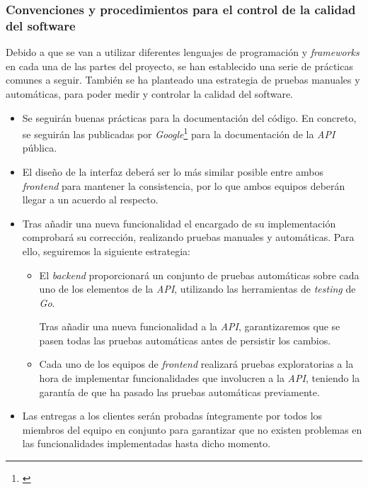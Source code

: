 \documentclass[11pt, a4paper, titlepage]{article}
\begin{document}
\subsubsection{Convenciones y procedimientos para el control de la calidad del software}

Debido a que se van a utilizar diferentes lenguajes de programación y \textit{frameworks} en cada una de las partes del proyecto, se han establecido una serie de prácticas comunes a seguir. También se ha planteado una estrategia de pruebas manuales y automáticas, para poder medir y controlar la calidad del software.

\begin{itemize}
    \item Se seguirán buenas prácticas para la documentación del código. En concreto, se seguirán las publicadas por \textit{Google}\footnote{\href{https://developers.google.com/style/api-reference-comments}{}} para la documentación de la \textit{API} pública.

    \item El diseño de la interfaz deberá ser lo más similar posible entre ambos \textit{frontend} para mantener la consistencia, por lo que ambos equipos deberán llegar a un acuerdo al respecto.
    \item Tras añadir una nueva funcionalidad el encargado de su implementación comprobará su corrección, realizando pruebas manuales y automáticas. Para ello, seguiremos la siguiente estrategia:
    \begin{itemize}
        \item El \textit{backend} proporcionará un conjunto de pruebas automáticas sobre cada uno de los elementos de la \textit{API}, utilizando las herramientas de \textit{testing} de \textit{Go}.

        Tras añadir una nueva funcionalidad a la \textit{API}, garantizaremos que se pasen todas las pruebas automáticas antes de persistir los cambios.

        \item Cada uno de los equipos de \textit{frontend} realizará pruebas exploratorias a la hora de implementar funcionalidades que involucren a la \textit{API}, teniendo la garantía de que ha pasado las pruebas automáticas previamente.
        \end{itemize}


    \item Las entregas a los clientes serán probadas íntegramente por todos los miembros del equipo en conjunto para garantizar que no existen problemas en las funcionalidades implementadas hasta dicho momento.


\end{itemize}
\end{document}
